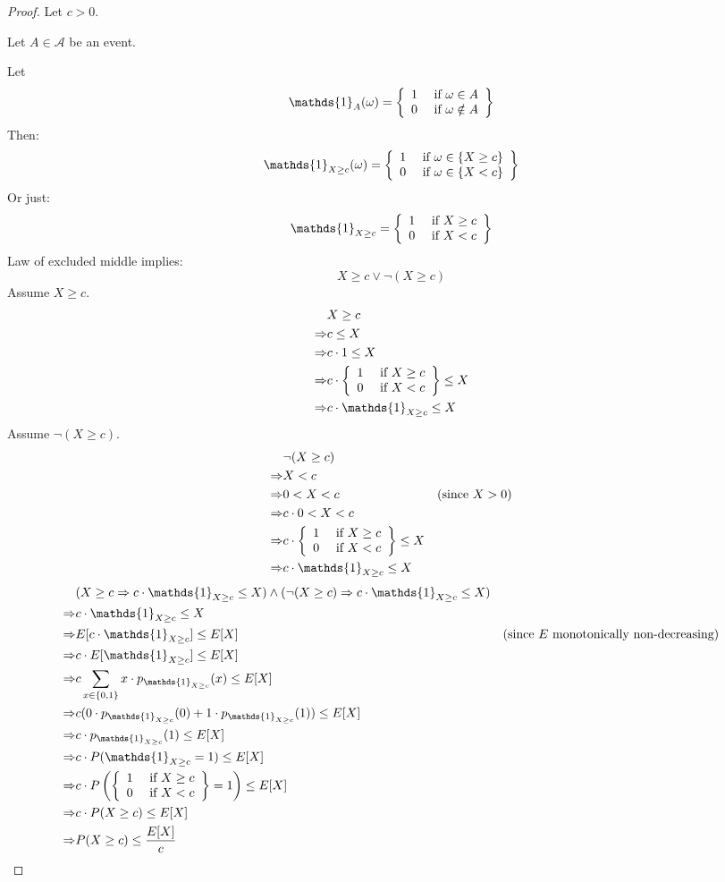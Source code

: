 \documentclass{article}
\begin{document}
\begin{proof}
Let \(c>0\).

Let \(A\in\mathcal{A}\) be an event.

Let
\[\mathds{1}_A(\omega)=\casesiie{1}{\omega\in A}{0}{\omega \notin A}\]
Then:
\[\mathds{1}_{X\geq c}(\omega)=\casesiie{1}{\omega\in \{X\geq c\}}{0}{\omega\in\{X<c\}}\]
Or just:
\[\mathds{1}_{X\geq c}=\casesiie{1}{X\geq c}{0}{X<c}\]
Law of excluded middle implies:
\[X \geq c \vee \neg(X \geq c)\]
Assume \(X\geq c\).
\begin{align*}
    & X\geq c \\
    \Rightarrow& c\leq X \\
    \Rightarrow& c\cdot 1\leq X \\
    \Rightarrow& c\cdot \casesiie{1}{X\geq c}{0}{X<c}\leq X \\
    \Rightarrow& c\cdot \mathds{1}_{X\geq c}\leq X \\
\end{align*}
Assume \(\neg(X\geq c)\).
\begin{align*}
    & \neg(X\geq c) \\
    \Rightarrow& X<c \\
    \Rightarrow& 0<X<c & (\text{since }X>0) \\
    \Rightarrow& c\cdot 0<X<c \\
    \Rightarrow& c\cdot \casesiie{1}{X\geq c}{0}{X<c} \leq X \\
    \Rightarrow& c\cdot \mathds{1}_{X\geq c}\leq X \\
\end{align*}
\begin{align*}
    & (X\geq c \Rightarrow c\cdot \mathds{1}_{X\geq c}\leq X) \wedge (\neg(X\geq c) \Rightarrow c\cdot \mathds{1}_{X\geq c}\leq X) \\
    \Rightarrow& c\cdot \mathds{1}_{X\geq c}\leq X \\
    \Rightarrow& E[c\cdot \mathds{1}_{X\geq c}]\leq E[X] & (\text{since } E\text{ monotonically non-decreasing}) \\
    \Rightarrow& c\cdot E[\mathds{1}_{X\geq c}]\leq E[X] \\
    \Rightarrow& c\sum_{x\in \{0,1\}} x\cdot p_{\mathds{1}_{X\geq c}}(x)\leq E[X] \\
    \Rightarrow& c (0\cdot p_{\mathds{1}_{X\geq c}}(0)+1\cdot p_{\mathds{1}_{X\geq c}}(1))\leq E[X] \\
    \Rightarrow& c\cdot p_{\mathds{1}_{X\geq c}}(1)\leq E[X] \\
    \Rightarrow& c\cdot P(\mathds{1}_{X\geq c}=1)\leq E[X] \\
    \Rightarrow& c\cdot P\left(\casesiie{1}{X\geq c}{0}{X<c}=1\right)\leq E[X] \\
    \Rightarrow& c\cdot P(X\geq c)\leq E[X] \\
    \Rightarrow& P(X\geq c)\leq \frac{E[X]}{c} \\
\end{align*}
\end{proof}
\end{document}
